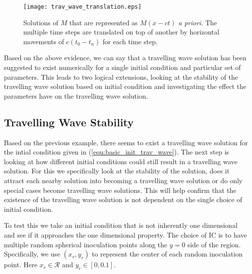 \begin{figure}[!htp]
  \centering
    \texttt{[image: trav\_wave\_translation.eps]}
    \caption{Solutions of $M$ that are represented as $M(x -ct)$ \textit{a priori}.
      The multiple time steps are translated on top of another by horizontal movements of $c (t_0 - t_n)$ for each time step.
      }
    \label{fig:trav_wave_translation}
\end{figure}

Based on the above evidence, we can say that a travelling wave solution has been suggested to exist numerically for a single initial condition and particular set of parameters.
This leads to two logical extensions, looking at the stability of the travelling wave solution based on initial condition and investigating the effect the parameters have on the travelling wave solution.

\subsection{Travelling Wave Stability}


Based on the previous example, there seems to exist a travelling wave solution for the intial condition given in (\ref{equ:basic_init_trav_wave}).
The next step is looking at how different initial conditions could still result in a travelling wave solution.
For this we specifically look at the stability of the solution, does it attract each nearby solution into becoming a travelling wave solution or do only special cases become travelling wave solutions.
This will help confirm that the existence of the travelling wave solution is not dependent on the single choice of initial condition.

To test this we take an initial condition that is not inherently one dimensional and see if it approaches the one dimensional property.
The choice of IC is to have multiple random spherical inoculation points along the $y=0$ side of the region.
Specifically, we use $(x_r, y_r)$ to represent the center of each random inoculation point.
Here $x_r \in \mathcal{R}$ and $y_r \in [0, 0.1]$.

